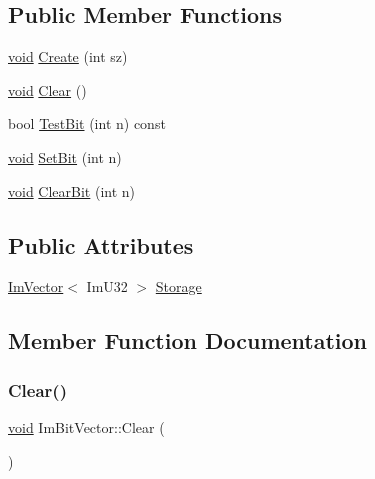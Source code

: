 \subsection*{Public Member Functions}
\begin{DoxyCompactItemize}
\item 
\hyperlink{imgui__impl__opengl3__loader_8h_ac668e7cffd9e2e9cfee428b9b2f34fa7}{void} \hyperlink{structImBitVector_a2e25a0809000ad27bfc3fb89f3d04829}{Create} (int sz)
\item 
\hyperlink{imgui__impl__opengl3__loader_8h_ac668e7cffd9e2e9cfee428b9b2f34fa7}{void} \hyperlink{structImBitVector_a6486ac9a357400a42af07909f937a659}{Clear} ()
\item 
bool \hyperlink{structImBitVector_ac472600d0eb12fabafae58db68ab7e2b}{Test\+Bit} (int n) const
\item 
\hyperlink{imgui__impl__opengl3__loader_8h_ac668e7cffd9e2e9cfee428b9b2f34fa7}{void} \hyperlink{structImBitVector_afab0abbd320b1f33d1988760be7cd39b}{Set\+Bit} (int n)
\item 
\hyperlink{imgui__impl__opengl3__loader_8h_ac668e7cffd9e2e9cfee428b9b2f34fa7}{void} \hyperlink{structImBitVector_aeca31d497bf4ceb032dfb92bf5515a40}{Clear\+Bit} (int n)
\end{DoxyCompactItemize}
\subsection*{Public Attributes}
\begin{DoxyCompactItemize}
\item 
\hyperlink{structImVector}{Im\+Vector}$<$ Im\+U32 $>$ \hyperlink{structImBitVector_a419abda300de5270b4475eac6ce250c2}{Storage}
\end{DoxyCompactItemize}


\subsection{Member Function Documentation}
\mbox{\label{structImBitVector_a6486ac9a357400a42af07909f937a659}} 
\subsubsection{\texorpdfstring{Clear()}{Clear()}}
{\footnotesize\ttfamily \hyperlink{imgui__impl__opengl3__loader_8h_ac668e7cffd9e2e9cfee428b9b2f34fa7}{void} Im\+Bit\+Vector\+::\+Clear (\begin{DoxyParamCaption}{ }\end{DoxyParamCaption})\hspace{0.3cm}{\ttfamily [inline]}}

